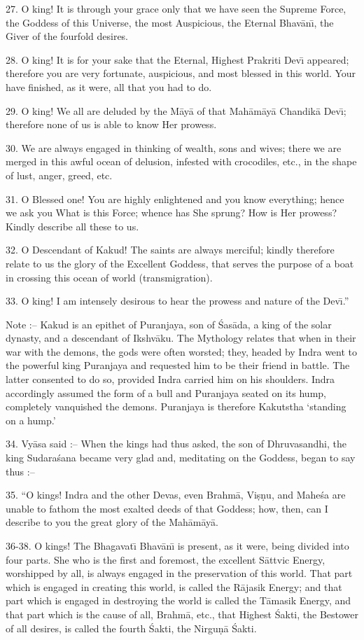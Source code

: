 27. O king! It is through your grace only that we have seen the Supreme Force, the Goddess of this Universe, the most Auspicious, the Eternal Bhav\=an\={\i}, the Giver of the fourfold desires.

28. O king! It is for your sake that the Eternal, Highest Prakriti Dev\={\i} appeared; therefore you are very fortunate, auspicious, and most blessed in this world. Your have finished, as it were, all that you had to do.

29. O king! We all are deluded by the M\=ay\=a of that Mah\=am\=ay\=a Chandik\=a Dev\={\i}; therefore none of us is able to know Her prowess.

30. We are always engaged in thinking of wealth, sons and wives; there we are merged in this awful ocean of delusion, infested with crocodiles, etc., in the shape of lust, anger, greed, etc.

31. O Blessed one! You are highly enlightened and you know everything; hence we ask you What is this Force; whence has She sprung? How is Her prowess? Kindly describe all these to us.

32. O Descendant of Kakud! The saints are always merciful; kindly therefore relate to us the glory of the Excellent Goddess, that serves the purpose of a boat in crossing this ocean of world (transmigration).

33. O king! I am intensely desirous to hear the prowess and nature of the Dev\={\i}.''

Note :-- Kakud is an epithet of Puranjaya, son of \'Sas\=ada, a king of the solar dynasty, and a descendant of Ikshv\=aku. The Mythology relates that when in their war with the demons, the gods were often worsted; they, headed by Indra went to the powerful king Puranjaya and requested him to be their friend in battle. The latter consented to do so, provided Indra carried him on his shoulders. Indra accordingly assumed the form of a bull and Puranjaya seated on its hump, completely vanquished the demons. Puranjaya is therefore Kakutstha `standing on a hump.'

34. Vy\=asa said :-- When the kings had thus asked, the son of Dhruvasandhi, the king Sudara\'sana became very glad and, meditating on the Goddess, began to say thus :--

35. ``O kings! Indra and the other Devas, even Brahm\=a, Vi\d{s}\d{n}u, and Mahe\'sa are unable to fathom the most exalted deeds of that Goddess; how, then, can I describe to you the great glory of the Mah\=am\=ay\=a.

36-38. O kings! The Bhagavat\={\i} Bhav\=an\={\i} is present, as it were, being divided into four parts. She who is the first and foremost, the excellent S\=attvic Energy, worshipped by all, is always engaged in the preservation of this world. That part which is engaged in creating this world, is called the R\=ajasik Energy; and that part which is engaged in destroying the world is called the T\=amasik Energy, and that part which is the cause of all, Brahm\=a, etc., that Highest \'Sakti, the Bestower of all desires, is called the fourth \'Sakti, the Nirgu\d{n}\=a \'Sakti.

